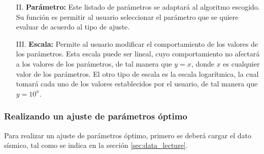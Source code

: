 \documentclass[12pt,twoside,letter]{ol-softwaremanual}
\begin{document}
\begin{itemize}[leftmargin=0.5in]
	\setlength\itemsep{0em} 
	
	\item[II.] \textbf{Parámetro:} Este listado de parámetros se adaptará al algoritmo escogido. Su función es permitir al usuario seleccionar el parámetro que se quiere evaluar de acuerdo al tipo de ajuste.       
    
    \item[III.] \textbf{Escala:} Permite al usuario modificar el comportamiento de los valores de los parámetros. Esta escala puede ser lineal, cuyo comportamiento no afectará a los valores de los parámetros, de tal manera que $y = x$, donde $x$ es cualquier valor de los parámetros. El otro tipo de escala es la escala logarítmica, la cual tomará cada uno de los valores establecidos por el usuario, de tal manera que $y = 10^x$.
    
\end{itemize}

\subsubsection{Realizando un ajuste de parámetros óptimo}

Para realizar un ajuste de parámetros óptimo, primero se deberá cargar el dato sísmico, tal como se indica en la sección \ref{sec:data_lecture}.
\end{document}
